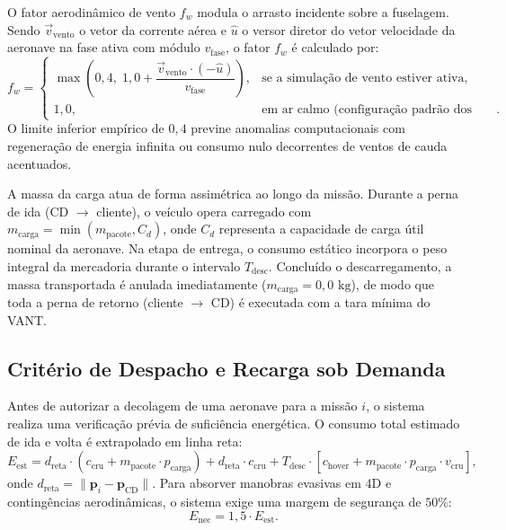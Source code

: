 O fator aerodinâmico de vento $f_w$ modula o arrasto incidente sobre a fuselagem. Sendo $\vec{v}_{\text{vento}}$ o vetor da corrente aérea e $\hat{u}$ o versor diretor do vetor velocidade da aeronave na fase ativa com módulo $v_{\text{fase}}$, o fator $f_w$ é calculado por:
\begin{equation}\label{eq:fator_vento}
f_w = \begin{cases}
\max\left( 0{,}4, \; 1{,}0 + \dfrac{\vec{v}_{\text{vento}} \cdot (-\hat{u})}{v_{\text{fase}}} \right), & \text{se a simulação de vento estiver ativa}, \\
1{,}0, & \text{em ar calmo (configuração padrão dos ensaios)}.
\end{cases}
\end{equation}
O limite inferior empírico de $0{,}4$ previne anomalias computacionais com regeneração de energia infinita ou consumo nulo decorrentes de ventos de cauda acentuados.

A massa da carga atua de forma assimétrica ao longo da missão. Durante a perna de ida (CD $\to$ cliente), o veículo opera carregado com $m_{\text{carga}} = \min(m_{\text{pacote}}, C_d)$, onde $C_d$ representa a capacidade de carga útil nominal da aeronave. Na etapa de entrega, o consumo estático incorpora o peso integral da mercadoria durante o intervalo $T_{\text{desc}}$. Concluído o descarregamento, a massa transportada é anulada imediatamente ($m_{\text{carga}} = 0{,}0\text{ kg}$), de modo que toda a perna de retorno (cliente $\to$ CD) é executada com a tara mínima do VANT.

\subsection{Critério de Despacho e Recarga sob Demanda}

Antes de autorizar a decolagem de uma aeronave para a missão $i$, o sistema realiza uma verificação prévia de suficiência energética. O consumo total estimado de ida e volta é extrapolado em linha reta:
\begin{equation}\label{eq:energia_estimada}
E_{\text{est}} = d_{\text{reta}} \cdot (c_{\text{cru}} + m_{\text{pacote}} \cdot p_{\text{carga}}) + d_{\text{reta}} \cdot c_{\text{cru}} + T_{\text{desc}} \cdot [c_{\text{hover}} + m_{\text{pacote}} \cdot p_{\text{carga}} \cdot v_{\text{cru}}],
\end{equation}
onde $d_{\text{reta}} = \|\mathbf{p}_i - \mathbf{p}_{\text{CD}}\|$. Para absorver manobras evasivas em 4D e contingências aerodinâmicas, o sistema exige uma margem de segurança de $50\%$:
\begin{equation}\label{eq:energia_necessaria}
E_{\text{nec}} = 1{,}5 \cdot E_{\text{est}}.
\end{equation}

